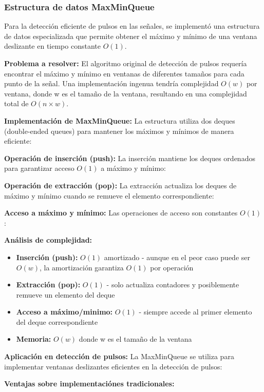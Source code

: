 \documentclass[12pt,a4paper]{article}
\begin{document}
\subsubsection{Estructura de datos MaxMinQueue}

Para la detección eficiente de pulsos en las señales, se implementó una estructura de
datos especializada que permite obtener el máximo y mínimo de una ventana deslizante
en tiempo constante $O(1)$.

\textbf{Problema a resolver:} El algoritmo original de detección de pulsos requería encontrar
el máximo y mínimo en ventanas de diferentes tamaños para cada punto de la señal. Una
implementación ingenua tendría complejidad $O(w)$ por ventana, donde w es el tamaño de
la ventana, resultando en una complejidad total de $O(n \times w)$.

\textbf{Implementación de MaxMinQueue:} La estructura utiliza dos deques (double-ended
queues) para mantener los máximos y mínimos de manera eficiente:

\textbf{Operación de inserción (push):} La inserción mantiene los deques ordenados para
garantizar acceso $O(1)$ a máximo y mínimo:

\textbf{Operación de extracción (pop):} La extracción actualiza los deques de máximo y
mínimo cuando se remueve el elemento correspondiente:

\textbf{Acceso a máximo y mínimo:} Las operaciones de acceso son constantes $O(1)$:

\textbf{Análisis de complejidad:}

\begin{itemize}
    \item \textbf{Inserción (push):} $O(1)$ amortizado - aunque en el peor caso puede ser $O(w)$, la
amortización garantiza $O(1)$ por operación
    \item \textbf{Extracción (pop):} $O(1)$ - solo actualiza contadores y posiblemente remueve un
    elemento del deque
    \item \textbf{Acceso a máximo/minimo:} $O(1)$ - siempre accede al primer elemento del deque
    correspondiente
    \item \textbf{Memoria:} $O(w)$ donde w es el tamaño de la ventana
\end{itemize}

\textbf{Aplicación en detección de pulsos:} La MaxMinQueue se utiliza para implementar
ventanas deslizantes eficientes en la detección de pulsos:

\textbf{Ventajas sobre implementaciónes tradicionales:}
\end{document}
